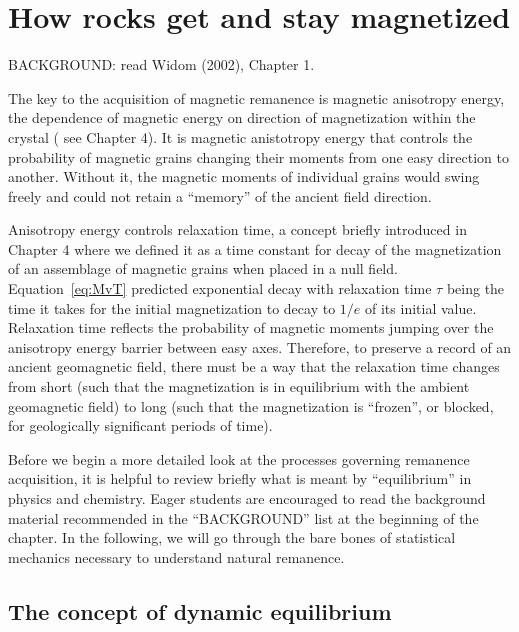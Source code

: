 \chapter{How rocks get and stay magnetized}
\label{sect:nrmintro}

\noindent
BACKGROUND:  read Widom  (2002), Chapter 1. \nocite{widom02}
\vskip 24pt

The key to the acquisition of magnetic remanence is magnetic anisotropy energy,  the dependence of  magnetic energy on  direction of magnetization within the crystal ( see Chapter 4).  It is magnetic anistotropy energy that  controls the probability of magnetic grains changing their moments from one easy direction to another.   Without it,
the magnetic moments of individual grains would swing freely and could not retain
a ``memory'' of the ancient field direction.   

Anisotropy energy controls relaxation time, a concept briefly introduced in Chapter 4 where  we defined it as a time constant for decay of the magnetization of an assemblage of magnetic grains when placed in a null field.  Equation~\ref{eq:MvT} predicted exponential decay with   relaxation time $\tau$ being the  time it takes for the initial magnetization to decay to $1/e$ of its initial value.     Relaxation time reflects the probability of magnetic moments jumping over  the anisotropy energy barrier between easy axes. 
Therefore, to preserve a record of an ancient geomagnetic field, 
there must be a way that  the relaxation time changes from short (such that the magnetization is in  equilibrium with the ambient geomagnetic field)
to long (such that the magnetization is ``frozen'', or blocked,  for geologically significant periods of time).  



Before we begin a more detailed look at the processes governing remanence acquisition, it is helpful to review briefly what is meant by
``equilibrium'' in physics and chemistry.  Eager students are encouraged to read the background material recommended in the ``BACKGROUND'' list at the beginning of the chapter.  In the following,  we will go through the bare bones of statistical mechanics necessary to understand natural remanence.


\section{The concept of dynamic equilibrium}

